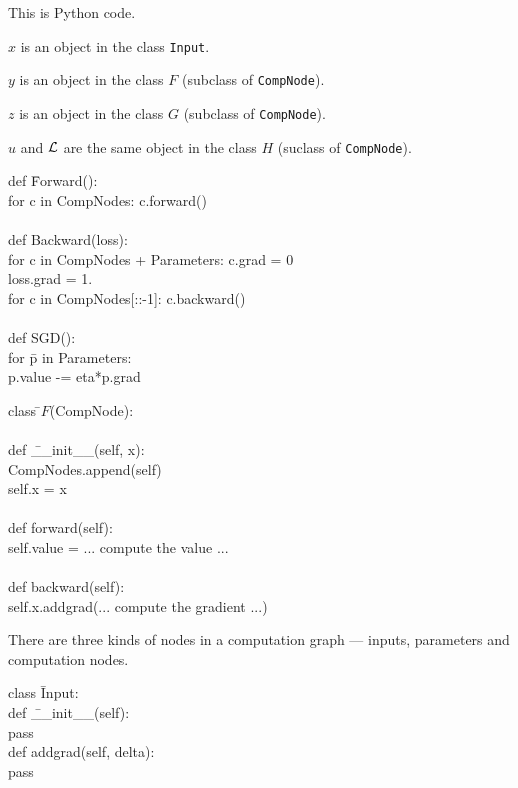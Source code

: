 {\vfill
This is Python code.

\vfill
$x$ is an object in the class {\tt Input}.

\vfill
$y$ is an object in the class $F$ (subclass of {\tt CompNode}).

\vfill
$z$ is an object in the class $G$ (subclass of {\tt CompNode}).

\medskip
$u$ and ${\cal L}$ are the same object in the class $H$ (suclass of {\tt CompNode}).


\begin{tabbing}
def \=Forward(): \\
   \>for c in CompNodes: c.forward() \\
\\
def \>Backward(loss): \\
    \> for c in CompNodes + Parameters: c.grad = 0 \\
    \> loss.grad = 1. \\
    \> for c in CompNodes[::-1]: c.backward() \\
    \\
def \> SGD(): \\
    \> for \= p in Parameters: \\
       \>\>p.value -= eta*p.grad
\end{tabbing}


\begin{tabbing}
  class \=$F$(CompNode): \\
  \\
    \>def \=\_\_init\_\_(self, x): \\
        \>\>CompNodes.append(self) \\
        \>\>self.x = x \\
\\
    \>def forward(self): \\
        \>\>self.value = ... compute the value ... \\
\\
    \>def backward(self): \\
        \>\>self.x.addgrad(... compute the gradient ...)
\end{tabbing}


There are three kinds of nodes in a computation graph --- inputs, parameters and computation nodes.

\vfill
\begin{tabbing}
class \=Input: \\
    \>def \=\_\_init\_\_(self): \\
        \>\>pass \\
    \>def \>addgrad(self, delta): \\
    \>\>pass
\end{tabbing}

}
